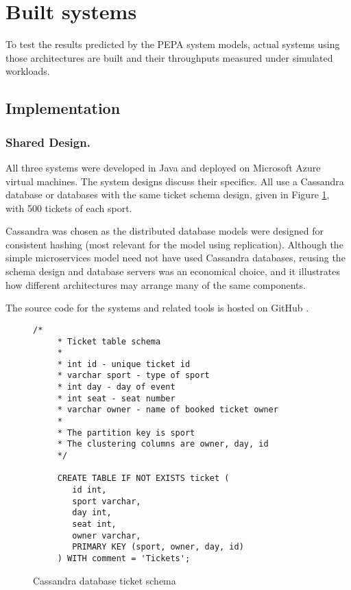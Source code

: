 %
%

\section{Built systems}\label{sec:built-systems}

To test the results predicted by the PEPA system models, actual systems using those architectures are built and their throughputs measured under simulated workloads.

\subsection{Implementation}

\subsubsection{Shared Design.}  All three systems were developed in Java and deployed on Microsoft Azure virtual machines.  The system designs discuss their specifics.  All use a Cassandra database or databases with the same ticket schema design, given in Figure \ref{figure:cassandra_ticket_schema}, with 500 tickets of each sport.

Cassandra was chosen as the distributed database models were designed for consistent hashing (most relevant for the model using replication).  Although the simple microservices model need not have used Cassandra databases, reusing the schema design and database servers was an economical choice, and it illustrates how different architectures may arrange many of the same components.

The source code for the systems and related tools is hosted on GitHub \cite{RN1073}.

\begin{figure}
	\label{figure:cassandra_ticket_schema}
	\centering
	\begin{lstlisting}[basicstyle=\ttfamily]
	/*
	 * Ticket table schema
	 * 
	 * int id - unique ticket id
	 * varchar sport - type of sport
	 * int day - day of event
	 * int seat - seat number
	 * varchar owner - name of booked ticket owner
	 * 
	 * The partition key is sport
	 * The clustering columns are owner, day, id
	 */
	
	 CREATE TABLE IF NOT EXISTS ticket (
		id int,
		sport varchar,
		day int,
		seat int,
		owner varchar,
		PRIMARY KEY (sport, owner, day, id)
	 ) WITH comment = 'Tickets';
	\end{lstlisting}
	\caption{Cassandra database ticket schema}
\end{figure}

